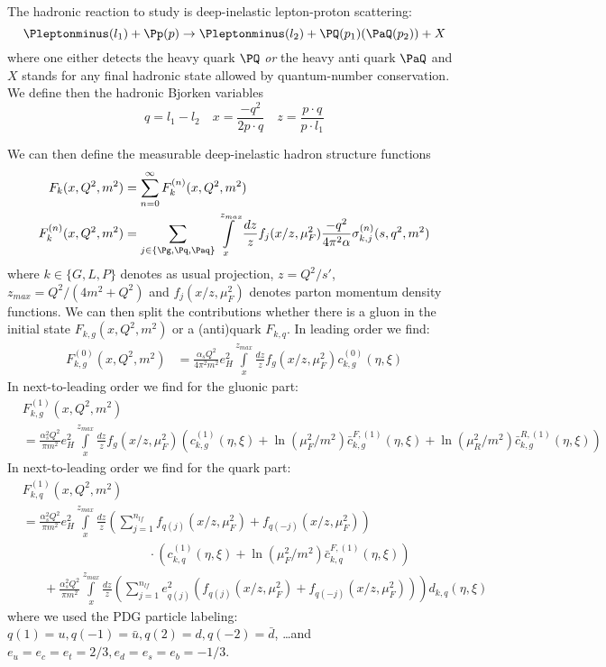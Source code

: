 The hadronic reaction to study is deep-inelastic lepton-proton scattering:
\begin{equation}
\Pleptonminus(l_1) + \Pp(p) \rightarrow \Pleptonminus(l_2) + \PQ(p_1)(\PaQ(p_2)) + X
\end{equation}
where one either detects the heavy quark $\PQ$ \textit{or} the heavy anti quark $\PaQ$ and $X$ stands for any final hadronic state allowed by quantum-number conservation. We define then the hadronic Bjorken variables
\begin{equation}
q=l_1-l_2 \quad x=\frac{-q^2}{2p\cdot q} \quad z = \frac{p\cdot q}{p\cdot l_1}
\end{equation}

We can then define the measurable deep-inelastic hadron structure functions
\begin{align}
F_k(x,Q^2,m^2) &= \sum_{n=0}^\infty F_{k}^{(n)}(x,Q^2,m^2)\\
F_{k}^{(n)}(x,Q^2,m^2) &= \sum_{j\in\{\Pg,\Pq,\Paq\}}\int\limits_x^{z_{max}} \frac{dz}{z} f_j(x/z,\mu_F^2) \frac{-q^2}{4\pi^2\alpha} \sigma^{(n)}_{k,j}(s,q^2,m^2)
\end{align}
where $k\in\{G,L,P\}$ denotes as usual projection, $z=Q^2/s'$, $z_{max} = Q^2/(4m^2+Q^2)$ and $f_j(x/z,\mu_F^2)$ denotes parton momentum density functions.
We can then split the contributions whether there is a gluon in the initial state $F_{k,g}(x,Q^2,m^2)$ or a (anti)quark $F_{k,q}$. In leading order we find:
\begin{align}
F_{k,g}^{(0)}(x,Q^2,m^2) &= \frac{\alpha_sQ^2}{4\pi^2m^2}e_H^2\int\limits_x^{z_{max}}\frac{dz}{z} f_g(x/z,\mu_F^2) c^{(0)}_{k,g}(\eta,\xi)
\end{align}
In next-to-leading order we find for the gluonic part:
\begin{align}
&F_{k,g}^{(1)}(x,Q^2,m^2) \nonumber\\
 &= \frac{\alpha_s^2Q^2}{\pi m^2}e_H^2\int\limits_x^{z_{max}}\frac{dz}{z} f_g(x/z,\mu_F^2) \left(c_{k,g}^{(1)}(\eta,\xi) + \ln(\mu_F^2/m^2)\bar c_{k,g}^{F,(1)}(\eta,\xi) + \ln(\mu_R^2/m^2)\bar c_{k,g}^{R,(1)}(\eta,\xi)\right)
\end{align}
In next-to-leading order we find for the quark part:
\begin{align}
&F_{k,q}^{(1)}(x,Q^2,m^2) \nonumber\\
 &= \frac{\alpha_s^2Q^2}{\pi m^2}e_H^2\int\limits_x^{z_{max}}\frac{dz}{z} \left(\sum_{j=1}^{n_{lf}}f_{q(j)}(x/z,\mu_F^2)+f_{q(-j)}(x/z,\mu_F^2)\right) \nonumber\\
 &\hspace{120pt} \cdot\left(c_{k,q}^{(1)}(\eta,\xi) + \ln(\mu_F^2/m^2)\bar c_{k,q}^{F,(1)}(\eta,\xi)\right) \nonumber\\
 &\hspace{20pt} + \frac{\alpha_s^2Q^2}{\pi m^2}\int\limits_x^{z_{max}}\frac{dz}{z} \left(\sum_{j=1}^{n_{lf}}e_{q(j)}^2\left(f_{q(j)}(x/z,\mu_F^2)+f_{q(-j)}(x/z,\mu_F^2)\right)\right) d_{k,q}(\eta,\xi)
\end{align}
where we used the PDG particle labeling\cite{Hagiwara:2002fs}: $q(1)=u,q(-1)=\bar u,q(2)=d,q(-2)=\bar d$, \ldots and $e_u = e_c = e_t = 2/3, e_d=e_s=e_b=-1/3$. 

